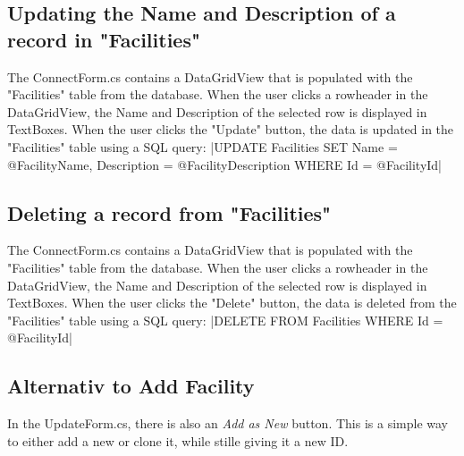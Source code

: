 \subsection{Updating the Name and Description of a record in "Facilities"}
The ConnectForm.cs contains a DataGridView that is populated with the "Facilities" table from the database. 
When the user clicks a rowheader in the DataGridView, the Name and Description of the selected row is displayed in TextBoxes. 
When the user clicks the "Update" button, the data is updated in the "Facilities" table using a SQL query:
|UPDATE Facilities SET Name = @FacilityName, Description = @FacilityDescription WHERE Id = @FacilityId|

\subsection{Deleting a record from "Facilities"}
The ConnectForm.cs contains a DataGridView that is populated with the "Facilities" table from the database. 
When the user clicks a rowheader in the DataGridView, the Name and Description of the selected row is displayed in TextBoxes.
When the user clicks the "Delete" button, the data is deleted from the "Facilities" table using a SQL query:
|DELETE FROM Facilities WHERE Id = @FacilityId|

\subsection{Alternativ to Add Facility}
In the UpdateForm.cs, there is also an \emph{Add as New} button. This is a simple way to either add a new or clone it, while stille giving it a new ID.